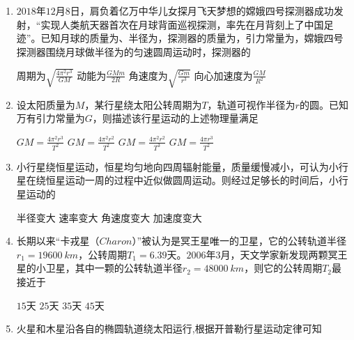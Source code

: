 
\begin{enumerate}[leftmargin=0em]
\renewcommand{\labelenumi}{\arabic{enumi}.}
\item
{}
$ 2018 $年$ 12 $月$ 8 $日，肩负着亿万中华儿女探月飞天梦想的嫦娥四号探测器成功发射，“实现人类航天器首次在月球背面巡视探测，率先在月背刻上了中国足迹”。已知月球的质量为、半径为，探测器的质量为，引力常量为，嫦娥四号探测器围绕月球做半径为的匀速圆周运动时，探测器的  


\fourchoices
{周期为$\sqrt { \frac { 4 \pi ^ { 2 } r ^ { 3 } } { G M } }$}
{动能为$\frac { G M m } { 2 R }$}
{角速度为$\sqrt { \frac { G m } { r ^ { 3 } } }$}
{向心加速度为$\frac { G M } { R ^ { 2 } }$}




\item 
{}
设太阳质量为$ M $，某行星绕太阳公转周期为$ T $，轨道可视作半径为$ r $的圆。已知万有引力常量为$ G $，则描述该行星运动的上述物理量满足  

\fourchoices
{$ G M = \frac { 4 \pi ^ { 2 } r ^ { 3 } } { T ^ { 2 } } $}
{$ G M = \frac { 4 \pi ^ { 2 } r ^ { 2 } } { T ^ { 2 } } $}
{$ G M = \frac { 4 \pi ^ { 2 } r ^ { 2 } } { T ^ { 3 } } $}
{$ G M = \frac { 4 \pi r ^ { 3 } } { T ^ { 2 } } $}


\item
{}
小行星绕恒星运动，恒星均匀地向四周辐射能量，质量缓慢减小，可认为小行星在绕恒星运动一周的过程中近似做圆周运动。则经过足够长的时间后，小行星运动的  

\fourchoices
{半径变大	 }
{速率变大}
{角速度变大 }
{加速度变大}



\item
{}
长期以来“卡戎星（$ Charon $）”被认为是冥王星唯一的卫星，它的公转轨道半径$ r_1=19600 \ km $，公转周期$ T_{1} =6.39 $天。$ 2006 $年$ 3 $月，天文学家新发现两颗冥王星的小卫星，其中一颗的公转轨道半径$ r_2=48000 \ km $，则它的公转周期$ T_{2} $最接近于  

\fourchoices
{$ 15 $天}
{$ 25 $天}
{$ 35 $天}
{$ 45 $天}



\item 
{}
火星和木星沿各自的椭圆轨道绕太阳运行,根据开普勒行星运动定律可知  




\end{enumerate}
